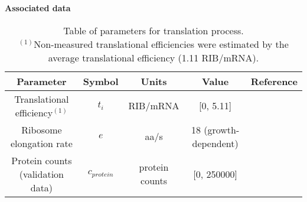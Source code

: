 \documentclass[12pt]{article}
\begin{document}
\textbf{Associated data}

\begin{table}[h!]
 \centering
 \begin{tabular}{c c c c c} 
 \hline
 Parameter & Symbol & Units & Value & Reference \\
 \hline
Translational efficiency$^{(1)}$ & $t_i$ & RIB/mRNA & [0, 5.11] & \cite{li2014quantifying}  \\
Ribosome elongation rate & $e$ & aa/s & 18 (growth-dependent) & \cite{bremer2008modulation} \\
Protein counts (validation data) & $c_{protein}$ & protein counts & [0, 250000] & \cite{schmidt2016quantitative}  \\
 \hline
\end{tabular}
\caption[Table of parameters for translation]{Table of parameters for translation process.\\
$^{(1)}$Non-measured translational efficiencies were estimated by the average translational efficiency (1.11 RIB/mRNA).
}
\end{table}


\newpage

\label{sec:references}


\end{document}

